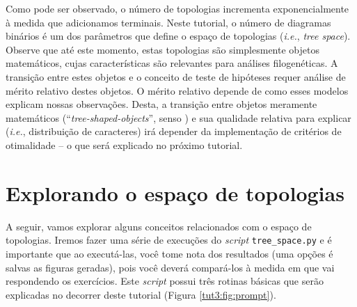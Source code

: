 \begin{refsection}
\begin{center}
\begin{longtable}{lcccccc}
\end{longtable}
\end{center}


Como pode ser observado, o número de topologias incrementa exponencialmente à medida que adicionamos terminais. Neste tutorial, o número de diagramas binários é um dos parâmetros que define o espaço de topologias (\textit{i.e.}, \textit{tree space}). Observe que até este momento, estas topologias são simplesmente objetos matemáticos, cujas características são relevantes para análises filogenéticas. A transição entre estes objetos e o conceito de teste de hipóteses requer análise de mérito relativo destes objetos. O mérito relativo depende de como esses modelos explicam nossas observações. Desta, a transição entre objetos meramente matemáticos (``\textit{tree-shaped-objects}'', senso \cite{Wheeler_2012}) e sua qualidade relativa para explicar (\textit{i.e.}, distribuição de caracteres) irá depender da implementação de critérios de otimalidade -- o que será explicado no próximo tutorial.


\section{Explorando o espaço de topologias}\label{tut3:tree_space_expĺore}

A seguir, vamos explorar alguns conceitos relacionados com o espaço de topologias. Iremos fazer uma série de execuções do \textit{script} \texttt{tree\_space.py} e é importante que ao executá-las, você tome nota dos resultados (uma opções é salvas as figuras geradas), pois você deverá compará-los à medida em que vai respondendo os exercícios. Este \textit{script} possui três rotinas básicas que serão explicadas no decorrer deste tutorial (Figura \ref{tut3:fig:prompt}).


\end{refsection}
